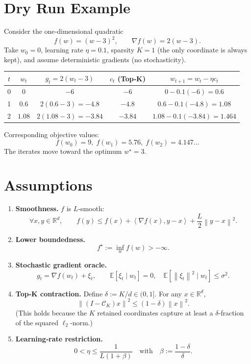 \documentclass{article}
\newcommand{\E}{\mathbb{E}}
\newcommand{\R}{\mathbb{R}}
\newcommand{\norm}[1]{\left\|#1\right\|}
\newcommand{\inner}[2]{\left\langle #1,#2\right\rangle}
\newcommand{\topk}{\mathcal{C}_K}
\begin{document}
\section*{Dry Run Example}
Consider the one‑dimensional quadratic
\[
f(w)=(w-3)^2,\qquad \nabla f(w)=2(w-3).
\]
Take $w_0=0$, learning rate $\eta=0.1$, sparsity $K=1$ (the only coordinate
is always kept), and assume deterministic gradients (no stochasticity).

\begin{center}
\begin{tabular}{c|c|c|c|c}
$t$ & $w_t$ & $g_t=2(w_t-3)$ & $c_t$ (Top‑K) & $w_{t+1}=w_t-\eta c_t$\\\hline
0 & $0$   & $-6$ & $-6$ & $0-0.1(-6)=0.6$\\
1 & $0.6$ & $2(0.6-3)=-4.8$ & $-4.8$ & $0.6-0.1(-4.8)=1.08$\\
2 & $1.08$& $2(1.08-3)=-3.84$ & $-3.84$ & $1.08-0.1(-3.84)=1.464$\\
\end{tabular}
\end{center}
Corresponding objective values:
\[
f(w_0)=9,\; f(w_1)=5.76,\; f(w_2)=4.147\ldots
\]
The iterates move toward the optimum $w^\star=3$.

\newpage
\section*{Assumptions}
\begin{enumerate}
\item \textbf{Smoothness.} $f$ is $L$‑smooth:
\[
\forall x,y\in\R^{d},\qquad 
f(y)\le f(x)+\inner{\nabla f(x)}{y-x}+\frac{L}{2}\norm{y-x}^{2}.
\tag{A1}
\]
\item \textbf{Lower boundedness.}
\[
f^\star:=\inf_{w}f(w)>-\infty .
\tag{A2}
\]
\item \textbf{Stochastic gradient oracle.}
\[
g_t=\nabla f(w_t)+\xi_t,\qquad 
\E[\xi_t\mid w_t]=0,\quad 
\E[\norm{\xi_t}^{2}\mid w_t]\le\sigma^{2}.
\tag{A3}
\]
\item \textbf{Top‑K contraction.}
Define $\delta:=K/d\in(0,1]$. For any $x\in\R^{d}$,
\[
\norm{(I-\topk)x}^{2}\le(1-\delta)\norm{x}^{2}.
\tag{A4}
\]
(This holds because the $K$ retained coordinates capture at least a
$\delta$‑fraction of the squared $\ell_{2}$‑norm.)
\item \textbf{Learning‑rate restriction.}
\[
0<\eta\le\frac{1}{L(1+\beta)}\quad\text{with}\quad
\beta:=\frac{1-\delta}{\delta}.
\tag{A5}
\]
\end{enumerate}
\end{document}

